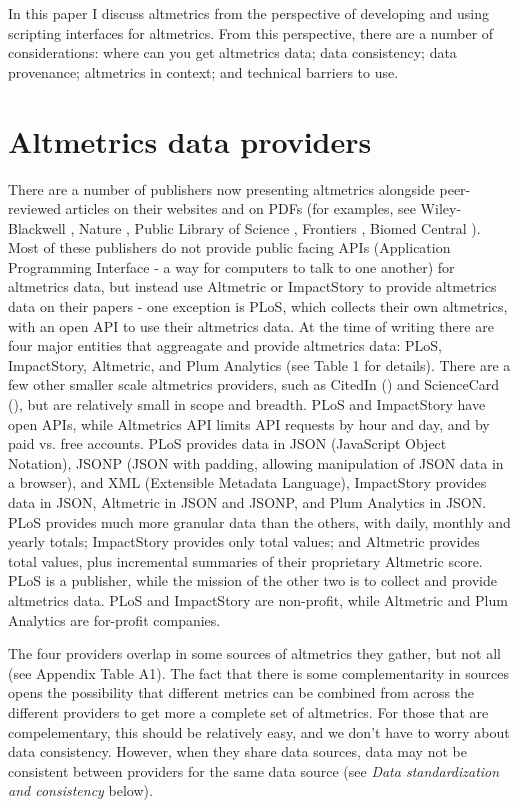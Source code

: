 \documentclass[letterpaper,superscriptaddress,showkeys,longbibliography]{revtex4-1}\usepackage{graphicx, color}
\begin{document}
In this paper I discuss altmetrics from the perspective of developing and using scripting interfaces for altmetrics. From this perspective, there are a number of considerations: where can you get altmetrics data; data consistency; data provenance; altmetrics in context; and technical barriers to use.

\section*{Altmetrics data providers}

There are a number of publishers now presenting altmetrics alongside peer-reviewed articles on their websites and on PDFs (for examples, see Wiley-Blackwell \cite{wiley}, Nature \cite{nature}, Public Library of Science \cite{plos}, Frontiers \cite{frontiers}, Biomed Central \cite{bmcentral}). Most of these publishers do not provide public facing APIs (Application Programming Interface - a way for computers to talk to one another) for altmetrics data, but instead use Altmetric or ImpactStory to provide altmetrics data on their papers - one exception is PLoS, which collects their own altmetrics, with an open API to use their altmetrics data. At the time of writing there are four major entities that aggreagate and provide altmetrics data: PLoS, ImpactStory, Altmetric, and Plum Analytics (see Table 1 for details). There are a few other smaller scale altmetrics providers, such as CitedIn (\cite{citedin}) and ScienceCard (\cite{sciencecard}), but are relatively small in scope and breadth. PLoS and ImpactStory have open APIs, while Altmetrics API limits API requests by hour and day, and by paid vs. free accounts. PLoS provides data in JSON (JavaScript Object Notation), JSONP (JSON with padding, allowing manipulation of JSON data in a browser), and XML (Extensible Metadata Language), ImpactStory provides data in JSON, Altmetric in JSON and JSONP, and Plum Analytics in JSON. PLoS provides much more granular data than the others, with daily, monthly and yearly totals; ImpactStory provides only total values; and Altmetric provides total values, plus incremental summaries of their proprietary Altmetric score. PLoS is a publisher, while the mission of the other two is to collect and provide altmetrics data. PLoS and ImpactStory are non-profit, while Altmetric and Plum Analytics are for-profit companies.

The four providers overlap in some sources of altmetrics they gather, but not all (see Appendix Table A1). The fact that there is some complementarity in sources opens the possibility that different metrics can be combined from across the different providers to get more a complete set of altmetrics. For those that are compelementary, this should be relatively easy, and we don't have to worry about data consistency. However, when they share data sources, data may not be consistent between providers for the same data source (see \emph{Data standardization and consistency} below).
\end{document}
